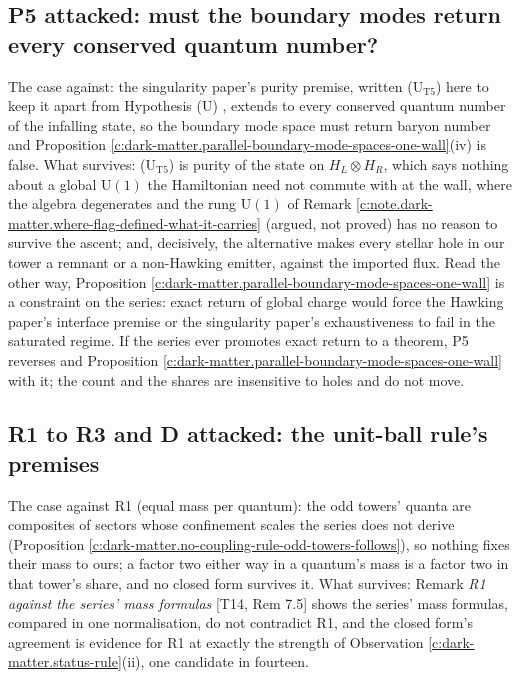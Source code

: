 \documentclass[11pt]{article}
\theoremstyle{definition}
\theoremstyle{plain}
\begin{document}
\subsection*{P5 attacked: must the boundary modes return every conserved quantum number?}
\label{c:note.dark-matter.setting-p5-attacked-must-boundary-modes}
The case against: the singularity paper's purity premise, written (U$_{\mathrm{T5}}$) here to keep it apart from Hypothesis (U) \cite[Premise~11.3(U)]{ButlerT5}, extends to every conserved quantum number of the infalling state, so the boundary mode space must return baryon number and Proposition \ref{c:dark-matter.parallel-boundary-mode-spaces-one-wall}(iv) is false. What survives: (U$_{\mathrm{T5}}$) is purity of the state on $H_{L} \otimes H_{R}$, which says nothing about a global $\mathrm{U}(1)$ the Hamiltonian need not commute with at the wall, where the algebra degenerates and the rung $\mathrm{U}(1)$ of Remark \ref{c:note.dark-matter.where-flag-defined-what-it-carries} (argued, not proved) has no reason to survive the ascent; and, decisively, the alternative makes every stellar hole in our tower a remnant or a non-Hawking emitter, against the imported flux. Read the other way, Proposition \ref{c:dark-matter.parallel-boundary-mode-spaces-one-wall} is a constraint on the series: exact return of global charge would force the Hawking paper's interface premise or the singularity paper's exhaustiveness to fail in the saturated regime. If the series ever promotes exact return to a theorem, P5 reverses and Proposition \ref{c:dark-matter.parallel-boundary-mode-spaces-one-wall} with it; the count and the shares are insensitive to holes and do not move.

\subsection*{R1 to R3 and D attacked: the unit-ball rule's premises}
\label{c:note.dark-matter.setting-r1-r3-d-attacked-unit}
The case against R1 (equal mass per quantum): the odd towers' quanta are composites of sectors whose confinement scales the series does not derive (Proposition \ref{c:dark-matter.no-coupling-rule-odd-towers-follows}), so nothing fixes their mass to ours; a factor two either way in a quantum's mass is a factor two in that tower's share, and no closed form survives it. What survives: Remark \emph{R1 against the series' mass formulas} [T14, Rem 7.5] shows the series' mass formulas, compared in one normalisation, do not contradict R1, and the closed form's agreement is evidence for R1 at exactly the strength of Observation \ref{c:dark-matter.status-rule}(ii), one candidate in fourteen.
\end{document}
